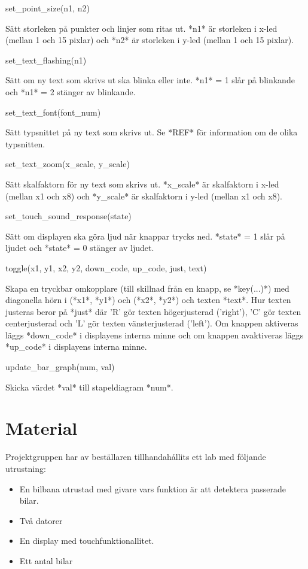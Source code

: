 \documentclass[10pt,oneside,swedish]{lips-no_customer}
\begin{document}
set\_point\_size(n1, n2)

Sätt storleken på punkter och linjer som ritas ut. *n1* är storleken i
x-led (mellan 1 och 15 pixlar) och *n2* är storleken i y-led (mellan 1
och 15 pixlar).

set\_text\_flashing(n1)

Sätt om ny text som skrivs ut ska blinka eller inte. *n1* = 1 slår på
blinkande och *n1* = 2 stänger av blinkande.

set\_text\_font(font\_num)

Sätt typsnittet på ny text som skrivs ut. Se *REF* för information om de
olika typsnitten.

set\_text\_zoom(x\_scale, y\_scale)

Sätt skalfaktorn för ny text som skrivs ut. *x\_scale* är skalfaktorn i
x-led (mellan x1 och x8) och *y\_scale* är skalfaktorn i y-led (mellan
x1 och x8).

set\_touch\_sound\_response(state)

Sätt om displayen ska göra ljud när knappar trycks ned. *state* = 1 slår
på ljudet och *state* = 0 stänger av ljudet.

toggle(x1, y1, x2, y2, down\_code, up\_code, just, text)

Skapa en tryckbar omkopplare (till skillnad från en knapp, se
*key(...)*) med diagonella hörn i (*x1*, *y1*) och (*x2*, *y2*) och
texten *text*. Hur texten justeras beror på *just* där 'R' gör texten
högerjusterad ('right'), 'C' gör texten centerjusterad och 'L' gör
texten vänsterjusterad ('left'). Om knappen aktiveras läggs *down\_code*
i displayens interna minne och om knappen avaktiveras läggs *up\_code* i
displayens interna minne.

update\_bar\_graph(num, val)

Skicka värdet *val* till stapeldiagram *num*.

\section{Material}

Projektgruppen har av beställaren tillhandahållits ett lab med följande utrustning:

\begin{itemize}
	\item En bilbana utrustad med givare vars funktion är att detektera passerade bilar.
	\item Två datorer
	\item En display med touchfunktionallitet. 
	\item Ett antal bilar 
\end{itemize}
\end{document}
